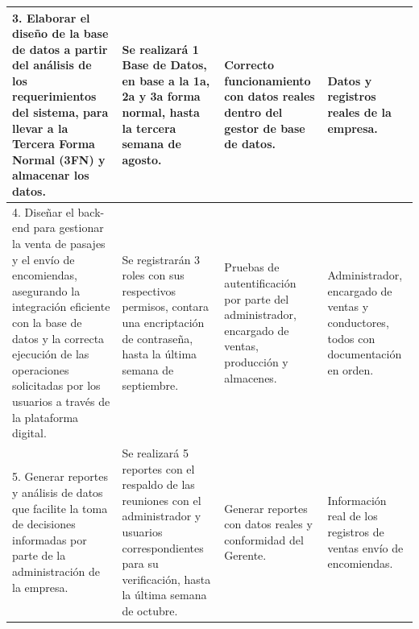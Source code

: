 \documentclass[12pt,letterpaper]{article}
\begin{document}
\begin{spacing}{1.1}
\begin{longtable}{| m{5.3cm} | m{2.9cm} | m{3.4cm} | m{3.4cm} | }
		3. Elaborar el diseño de la base de datos a partir del análisis de los requerimientos del sistema, para llevar a la Tercera Forma Normal (3FN) y almacenar los datos. &  Se realizará 1 Base de Datos, en base a la 1a, 2a y 3a forma normal, hasta la tercera semana de agosto. & Correcto funcionamiento con datos reales dentro del gestor de base de datos. & Datos y registros reales de la empresa. \\
		\hline
		
		4. Diseñar el back-end para gestionar la venta de pasajes y el envío de encomiendas, asegurando la integración eficiente con la base de datos y la correcta ejecución de las operaciones solicitadas por los usuarios a través de la plataforma digital. & Se registrarán 3 roles con sus respectivos permisos, contara una encriptación de contraseña, hasta la
		última semana de septiembre. & Pruebas de autentificación
		por parte del administrador, encargado de ventas, producción y almacenes. & Administrador, encargado de ventas y conductores, todos con documentación en orden. \\
		\hline
		
		5. Generar reportes y análisis de datos que facilite la toma de decisiones informadas por parte de la administración de la empresa. &  Se realizará 5 reportes con el respaldo de las reuniones con el administrador y usuarios
		correspondientes para su verificación, hasta la última semana de
		octubre. & Generar reportes con datos reales y conformidad del Gerente. & Información real de los registros de ventas envío de encomiendas.\\
		\hline
		

\end{longtable}
\end{spacing}
\end{document}

